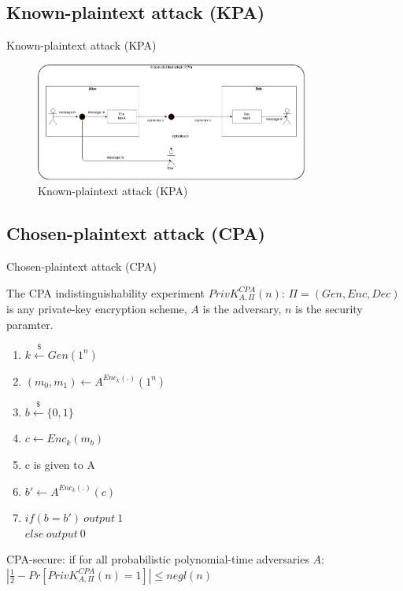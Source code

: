 \documentclass[ucs,9pt]{beamer}
\begin{document}
\subsection{Known-plaintext attack (KPA)}
    
\begin{frame}{Known-plaintext attack (KPA)}
    
    \begin{figure}[h]
        \centering
        \includegraphics[width=0.8\textwidth]{figures/KPA.png}
        \caption{Known-plaintext attack (KPA)}
    \end{figure}
\end{frame}


\subsection{Chosen-plaintext attack (CPA)}

\begin{frame}{Chosen-plaintext attack (CPA)}
    \begin{block}{The CPA indistinguishability experiment $PrivK_{A,\Pi}^{CPA}(n)$:}
        $\Pi = (Gen, Enc, Dec)$ is any private-key encryption scheme, $A$ is the adversary, $n$ is the security paramter.
        
        \begin{enumerate}
            \item $k \overset{\$}{\leftarrow} Gen(1^n)$
            \item $(m_{0},m_{1}) \leftarrow A^{Enc_{k}(.)}(1^{n})$
            \item $b \overset{\$}{\leftarrow} \{0,1\}$
            \item $c \leftarrow Enc_{k}(m_{b})$
            \item c is given to A
            \item $b' \leftarrow A^{Enc_{k}(.)}(c)$
            \item $if(b = b')\ output\ 1$ \\
            $else\ output\ 0$
        \end{enumerate}
        
        CPA-secure: if for all probabilistic polynomial-time adversaries $A$:\\
        $\left | \frac{1}{2} - Pr[PrivK_{A,\Pi}^{CPA}(n) = 1] \right | \leq negl(n)$
    \end{block}
\end{frame}
\end{document}
